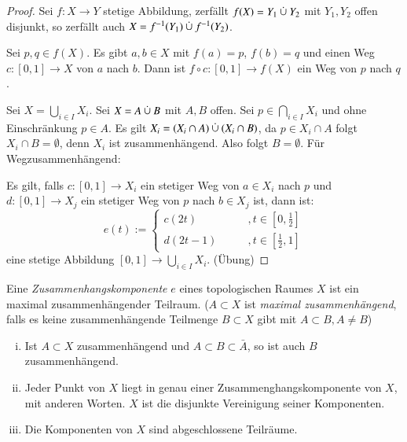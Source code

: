 \documentclass[a4paper,10pt]{scrartcl}
\begin{document}
\begin{proof}
\item Sei $ f:X\to Y$ stetige Abbildung, zerfällt $f(X)=Y_1\mathbin{\dot{\cup}} Y_2$ mit $Y_1, Y_2$ offen disjunkt, so zerfällt auch $ X=f^{-1}(Y_1)\mathbin{\dot{\cup}} f^{-1}(Y_2) $. 
\begin{figure}[H]
\centering
 \fixme[fig23]
\caption{}
\end{figure}
Sei $ p,q \in f(X) $. Es gibt $ a,b\in X $ mit $ f(a)=p $, $ f(b)=q $ und einen Weg $ c:[0,1]\to X $ von $ a $ nach $ b $. Dann ist $ f\circ c:[0,1]\to f(X) $ ein Weg von $ p $ nach $ q $.
\item Sei $ X=\bigcup_{i\in I}X_i $. Sei $ X=A\mathbin{\dot{\cup}} B $ mit $ A,B $ offen. Sei $ p\in \bigcap_{i\in I}X_i $ und ohne Einschränkung $ p\in A $.  Es gilt $ X_i=(X_i\cap A)\mathbin{\dot{\cup}} (X_i\cap B) $, da $ p\in X_i\cap A $ folgt $ X_i\cap B=\emptyset $, denn $ X_i $ ist zusammenhängend. Also folgt $ B=\emptyset $.
Für Wegzusammenhängend:
\begin{figure}[H]
\centering
 \fixme[fig24]
\caption{}
\end{figure}
Es gilt, falls $ c:[0,1]\to X_i $ ein stetiger Weg von $ a\in X_i $ nach $ p $ und $ d:[0,1]\to X_j $ ein stetiger Weg von $ p $ nach $ b\in X_j $ ist, dann ist:
\[
e(t):=\begin{cases}c(2t)\qquad &,t\in[0,\frac 1 2]\\ d(2t-1)\qquad &,t\in[\frac 1 2, 1]\end{cases}
\]
eine stetige Abbildung $ [0,1]\to \bigcup_{i\in I}X_i $. (Übung)
\end{proof}
\begin{df}
 Eine \emph{Zusammenhangskomponente} $e$ eines topologischen Raumes $X$ ist ein maximal zusammenhängender Teilraum.
($A\subset X$ ist \emph{maximal zusammenhängend}, falls es keine zusammenhängende Teilmenge $B\subset X$ gibt mit $A\subset B, A\neq B$)
\end{df}
\begin{st}\label{thm:4.4}
 \begin{enumerate}[(i)]
  \item Ist $A\subset X$ zusammenhängend und $A\subset B\subset \bar A$, so ist auch $B$ zusammenhängend.
  \item Jeder Punkt von $X$ liegt in genau einer Zusammenghangskomponente von $X$, mit anderen Worten. $X$ ist die disjunkte Vereinigung seiner Komponenten.
\item Die Komponenten von $X$ sind abgeschlossene Teilräume.
 \end{enumerate}

\end{st}
\end{document}
